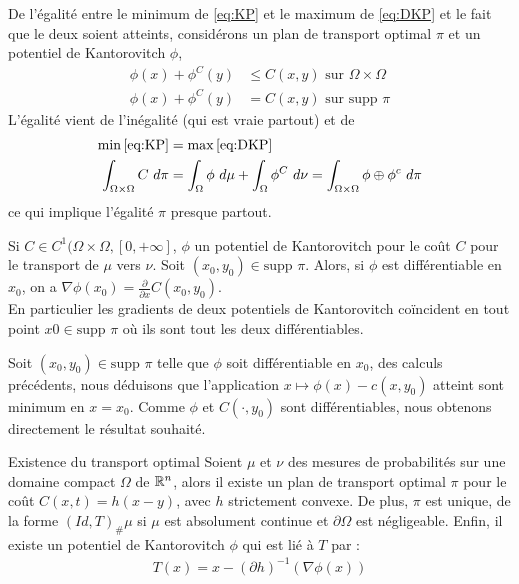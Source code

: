 \documentclass[a4paper,12pt]{article}
\newcommand{\supp}{\text{supp }}
\begin{document}
De l'égalité entre le minimum de \eqref{eq:KP} et le maximum de \eqref{eq:DKP} et le fait que le deux soient atteints, considérons un plan de transport optimal $\pi$ et un potentiel de Kantorovitch $\phi$, 
\begin{align}
\phi(x)+\phi^C(y) &\leq C(x,y) \text{ sur } \Omega\times\Omega \\
\phi(x)+\phi^C(y) &= C(x,y) \text{ sur }\supp\pi
\end{align}
L'égalité vient de l'inégalité (qui est vraie partout) et de 
\begin{align}
\min\eqref{eq:KP} &= \max \eqref{eq:DKP}\nonumber\\
\int_{\Omega\times\Omega} C\ d\pi &= \int_{\Omega}\phi\ d\mu +  \int_{\Omega} \phi^C\ d\nu = \int_{\Omega\times\Omega} \phi\oplus\phi^c\ d\pi
\end{align}
ce qui implique l'égalité $\pi$ presque partout. 

\begin{proposition}
Si $C\in C^1(\Omega\times\Omega,[0,+\infty]$, $\phi$ un potentiel de Kantorovitch pour le coût $C$ pour le transport de $\mu$ vers $\nu$. Soit $(x_0,y_0)\in\supp\pi$. Alors, si $\phi$ est différentiable en $x_0$, on a $\nabla\phi(x_0)= \frac{\partial}{\partial x}C(x_0,y_0)$.\\
En particulier les gradients de deux potentiels de Kantorovitch coïncident en tout point $x0\in\supp\pi$ où ils sont tout les deux différentiables.
\end{proposition}
\begin{preuve}
Soit $(x_0,y_0)\in\supp\pi$ telle que $\phi$ soit différentiable en $x_0$, des calculs précédents, nous déduisons que l'application $x\mapsto\phi(x)-c(x,y_0)$ atteint sont minimum en $x=x_0$. 
Comme $\phi$ et $C(\cdot,y_0)$ sont différentiables, nous obtenons directement le résultat souhaité. 
\end{preuve}


\begin{theoreme}{Existence du transport optimal}
\label{thm:existtrasp}
Soient $\mu$ et $\nu$ des mesures de probabilités sur une domaine compact $\Omega$ de $\mathbb{R}^n$, alors il existe un plan de transport optimal $\pi$ pour le coût $C(x,t) = h(x-y)$, avec $h$ strictement convexe. 
De plus, $\pi$ est unique, de la forme $(Id,T)_{\#}\mu$ si $\mu$ est absolument continue et $\partial\Omega$ est négligeable. Enfin, il existe un potentiel de Kantorovitch $\phi$ qui est lié à $T$ par :
\begin{align}
T(x) = x- (\partial h)^{-1}(\nabla\phi(x))
\end{align}
\end{theoreme}
\end{document}
